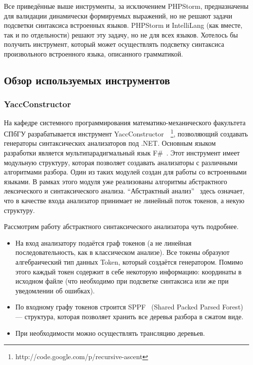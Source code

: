 Все приведённые выше инструменты, за исключением PHPStorm, предназначены для валидации динамически формируемых выражений, но не решают задачи подсветки синтаксиса встроенных языков. PHPStorm и IntelliLang (как вместе, так и по отдельности) решают эту задачу, но не для всех языков. Хотелось бы получить инструмент, который может осуществлять подсветку синтаксиса произвольного встроенного языка, описанного грамматикой.

\subsection{Обзор используемых инструментов}

\subsubsection{YaccConstructor}
На кафедре системного программирования математико-механического факультета СПбГУ разрабатывается инструмент YaccConstructor~\cite{YC_paper}~\footnote{http://code.google.com/p/recursive-ascent}, позволяющий создавать генераторы синтаксических анализаторов под .NET. Основным языком разработки является мультипарадигмальный язык F\#~\cite{FSharp}. Этот инструмент имеет модульную структуру, которая позволяет создавать анализаторы с различными алгоритмами разбора. Один из таких модулей создан для работы со встроенными языками. В рамках этого модуля уже реализованы алгоритмы абстрактного лексического и синтаксического анализа. ``Абстрактный анализ''~\cite{ARNGLR} здесь означает, что в качестве входа анализатор принимает не линейный поток токенов, а некую структуру. 

Рассмотрим работу абстрактного синтаксического анализатора чуть подробнее. 
\begin{itemize}
\item
{
На вход анализатору подаётся граф токенов (а не линейная последовательность, как в классическом анализе). Все токены образуют алгебраический тип данных Token, который создаётся генератором. Помимо этого каждый токен содержит в себе некоторую информацию: координаты в исходном файле (что необходимо при подсветке синтаксиса или же при уведомлении об ошибках).
}
\item
{По входному графу токенов строится SPPF~\cite{RNGLR} (Shared Packed Parsed Forest) --- структура, которая позволяет хранить все деревья разбора в сжатом виде. 
}
\item При необходимости можно осуществлять трансляцию деревьев. 
\end{itemize}

